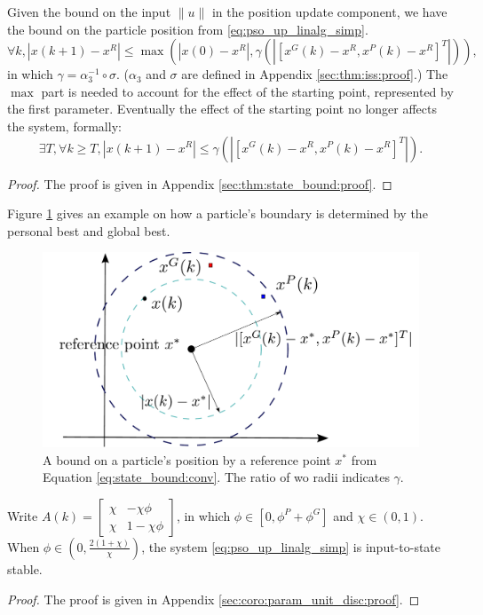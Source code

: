 \begin{mythm}
\label{thm:state_bound}
Given the bound on the input $ \lVert u \rVert $ in the position update component, we have the bound on the particle position from \eqref{eq:pso_up_linalg_simp}.
\begin{equation}
\label{eq:state_bound}
\forall k, 
| x(k+1) - x^{R} | \leq \max ( | x(0) - x^{R} | , \gamma ( | [ x^{G}(k) - x^{R}, x^{P}(k) - x^{R} ]^{T} | ) ),
\end{equation}
in which $ \gamma = \alpha_{3}^{-1} \circ \sigma $.
($ \alpha_{3} $ and $ \sigma $ are defined in Appendix \ref{sec:thm:iss:proof}.)
The $ \max $ part is needed to account for the effect of the starting point, represented by the first parameter. Eventually the effect of the starting point no longer affects the system, formally:
\begin{equation}
\label{eq:state_bound:conv}
\exists T, \forall k \geq T, 
|  x(k+1) - x^{R} | \leq \gamma ( | [ x^{G}(k) - x^{R}, x^{P}(k) - x^{R} ]^{T} | ).
\end{equation}
\begin{proof}
The proof is given in Appendix \ref{sec:thm:state_bound:proof}.
\end{proof}
\end{mythm}

Figure \ref{fig:boundary} gives an example on how a particle's boundary is determined by the personal best and global best.

\begin{figure}
\centering
\includegraphics[width=0.7\linewidth]{./fig/boundary}
\caption{A bound on a particle's position by a reference point $ x^{*} $ from Equation \ref{eq:state_bound:conv}.
The ratio of wo radii indicates $ \gamma $.}
\label{fig:boundary}
\end{figure}

\begin{mycoro}
\label{coro:param_unit_disc}
Write $ A(k) = 
\begin{bmatrix}
\chi & - \chi \phi \\
\chi & 1 - \chi \phi
\end{bmatrix}
$, in which
$ \phi \in [0,  \phi^{P} + \phi^{G} ] $ and $ \chi \in ( 0, 1 ) $.
When $ \phi \in (0 , \frac{2(1+\chi)}{\chi} ) $, the system \eqref{eq:pso_up_linalg_simp} is input-to-state stable.
\begin{proof}
The proof is given in Appendix \ref{sec:coro:param_unit_disc:proof}.
\end{proof}
\end{mycoro}

